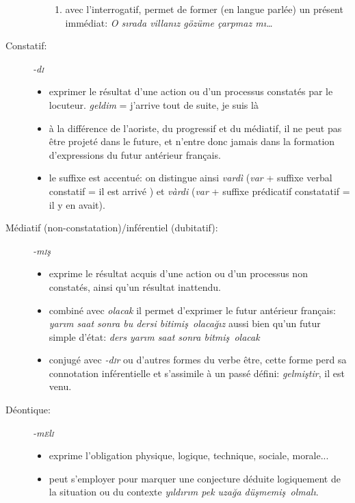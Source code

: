 \documentclass{cours}
\newcommand{\ch}{\c{s}}
\newcommand{\ug}{\u{g}}
\newcommand{\sci}{\textsc{i}}
\newcommand{\sce}{\textsc{e}}
\begin{document}
\begin{description}
\begin{itemize}
\begin{enumerate}
                        \item avec l'interrogatif, permet de former (en langue parlée) un présent immédiat: \textsl{O s\i rada villan\i z gözüme çarpmaz m\i\dots}
                    \end{enumerate}
          \end{itemize}
    \item [Constatif:] \textsl{-d\sci}
          \begin{itemize}
              \item exprimer le résultat d'une action ou d'un processus constatés par le locuteur. \textsl{geldim} = j'arrive tout de suite, je suis là
              \item à la différence de l'aoriste, du progressif et du médiatif, il ne peut pas être projeté dans le future, et n'entre donc jamais dans la formation d'expressions du futur antérieur français.
              \item le suffixe est accentué: on distingue ainsi \textsl{vard\`i} (\textsl{var} + suffixe verbal constatif = \og il est arrivé \fg) et \textsl{v\`ardi} (\textsl{var} + suffixe prédicatif constatatif = \og il y en avait\fg).
          \end{itemize}
    \item [Médiatif (non-constatation)/inférentiel (dubitatif):] \textsl{-m\sci\ch}
          \begin{itemize}
              \item exprime le résultat acquis d'une action ou d'un processus non constatés, ainsi qu'un résultat inattendu.
              \item combiné avec \textsl{olacak} il permet d'exprimer le futur antérieur français: \textsl{yar\i m saat sonra bu dersi bitimi\ch \ olaca\ug \i z} aussi bien qu'un futur simple d'état: \textsl{ders yar\i m saat sonra bitmi\ch \ olacak}
              \item conjugé avec \textsl{-d\sci r} ou d'autres formes du verbe être, cette forme perd sa connotation inférentielle et s'assimile à un passé défini: \textsl{gelmi\ch tir}, il est venu.
          \end{itemize}
    \item [Déontique:] \textsl{-m\sce l\sci}
          \begin{itemize}
              \item exprime l'obligation physique, logique, technique, sociale, morale...
              \item peut s'employer pour marquer une conjecture déduite logiquement de la situation ou du contexte \textsl{y\i ld\i r\i m pek uza\ug a dü\ch memi\ch \ olmal\i}.

\end{itemize}
\end{description}
\end{document}
